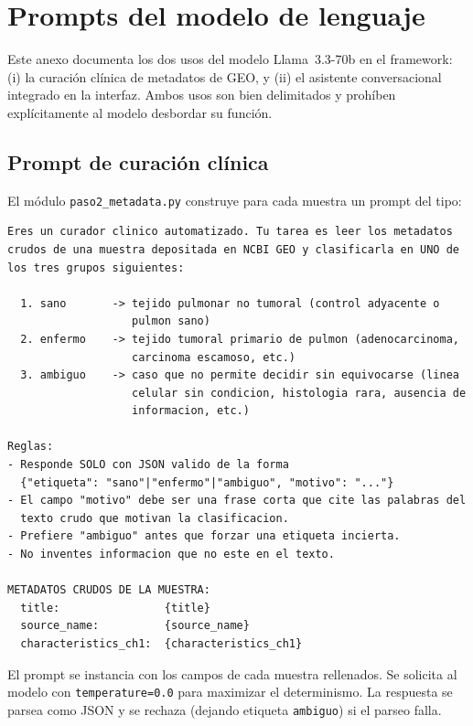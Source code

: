 \chapter{Prompts del modelo de lenguaje}
\label{anexo:prompts}

Este anexo documenta los dos usos del modelo Llama~3.3-70b en el
framework: (i) la curación clínica de metadatos de GEO, y (ii) el
asistente conversacional integrado en la interfaz. Ambos usos son bien
delimitados y prohíben explícitamente al modelo desbordar su función.

\section*{Prompt de curación clínica}
{}

El módulo \texttt{paso2\_metadata.py} construye para cada muestra un
prompt del tipo:

\begin{lstlisting}[caption={Prompt de curación (esquemático).}]
Eres un curador clinico automatizado. Tu tarea es leer los metadatos
crudos de una muestra depositada en NCBI GEO y clasificarla en UNO de
los tres grupos siguientes:

  1. sano       -> tejido pulmonar no tumoral (control adyacente o
                   pulmon sano)
  2. enfermo    -> tejido tumoral primario de pulmon (adenocarcinoma,
                   carcinoma escamoso, etc.)
  3. ambiguo    -> caso que no permite decidir sin equivocarse (linea
                   celular sin condicion, histologia rara, ausencia de
                   informacion, etc.)

Reglas:
- Responde SOLO con JSON valido de la forma
  {"etiqueta": "sano"|"enfermo"|"ambiguo", "motivo": "..."}
- El campo "motivo" debe ser una frase corta que cite las palabras del
  texto crudo que motivan la clasificacion.
- Prefiere "ambiguo" antes que forzar una etiqueta incierta.
- No inventes informacion que no este en el texto.

METADATOS CRUDOS DE LA MUESTRA:
  title:                {title}
  source_name:          {source_name}
  characteristics_ch1:  {characteristics_ch1}
\end{lstlisting}

El prompt se instancia con los campos de cada muestra rellenados. Se
solicita al modelo con \texttt{temperature=0.0} para maximizar el
determinismo. La respuesta se parsea como JSON y se rechaza (dejando
etiqueta \texttt{ambiguo}) si el parseo falla.

